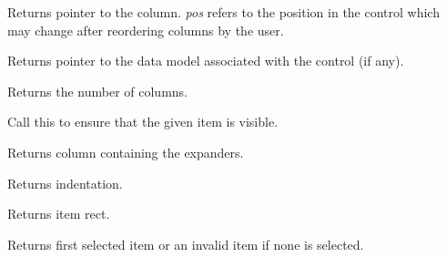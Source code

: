 \label{wxdataviewctrlgetcolumn}


Returns pointer to the column. {\it pos} refers to the 
position in the control which may change after reordering
columns by the user.

\label{wxdataviewctrlgetmodel}


Returns pointer to the data model associated with the
control (if any).

\label{wxdataviewctrlgetcolumncount}


Returns the number of columns.

\label{wxdataviewctrlensurevisible}


Call this to ensure that the given item is visible.

\label{wxdataviewctrlgetexpandercolumn}


Returns column containing the expanders.

\label{wxdataviewctrlgetindent}


Returns indentation.

\label{wxdataviewctrlgetitemrect}


Returns item rect.

\label{wxdataviewctrlgetselection}


Returns first selected item or an invalid item if none is selected.


